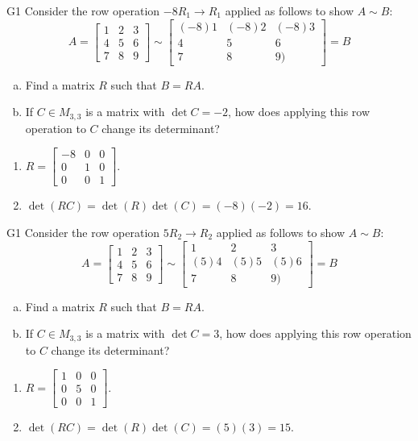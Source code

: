 \begin{problem}{G1}
Consider the row operation \(-8R_1\to R_1\) applied as follows to show
\(A\sim B\):
\[
A=\begin{bmatrix}1&2&3\\4&5&6\\7&8&9\end{bmatrix}
  \sim
\begin{bmatrix}(-8)1&(-8)2&(-8)3\\4&5&6\\7&8&9)\end{bmatrix}=B
\]
\begin{enumerate}[(a)]
\item Find a matrix \(R\) such that \(B=RA\).
\item If \(C \in M_{3,3}\) is a matrix with \(\det C = -2\), how does applying this row operation to \(C\) change its determinant?
\end{enumerate}
\end{problem}
\begin{solution}
\begin{enumerate}
\item \(R= \begin{bmatrix} -8 & 0 & 0 \\ 0 & 1 & 0 \\ 0 & 0 & 1 \end{bmatrix}\).
\item \(\det(RC)= \det(R)\det(C)=(-8)(-2)=16\).
\end{enumerate}
\end{solution}

\begin{problem}{G1}
Consider the row operation \(5R_2\to R_2\) applied as follows to show
\(A\sim B\):
\[
A=\begin{bmatrix}1&2&3\\4&5&6\\7&8&9\end{bmatrix}
  \sim
\begin{bmatrix}1&2&3\\(5)4&(5)5&(5)6\\7&8&9)\end{bmatrix}=B
\]
\begin{enumerate}[(a)]
\item Find a matrix \(R\) such that \(B=RA\).
\item If \(C \in M_{3,3}\) is a matrix with \(\det C = 3\), how does applying this row operation to \(C\) change its determinant?
\end{enumerate}
\end{problem}
\begin{solution}
\begin{enumerate}
\item \(R= \begin{bmatrix} 1 & 0 & 0 \\ 0 & 5 & 0 \\ 0 & 0 & 1 \end{bmatrix}\).
\item \(\det(RC)= \det(R)\det(C)=(5)(3)=15\).
\end{enumerate}
\end{solution}

